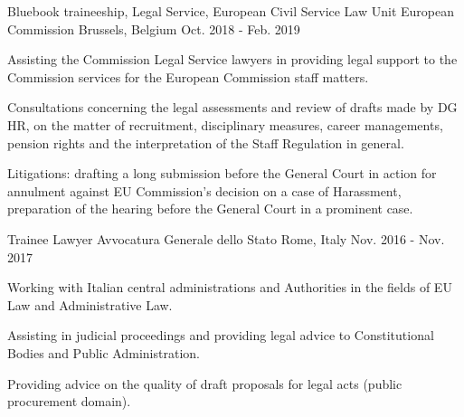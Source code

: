 \begin{cventries}
  \cventry
    {Bluebook traineeship, Legal Service, European Civil Service Law Unit} %
    {European Commission} %
    {Brussels, Belgium} %
    {Oct. 2018 - Feb. 2019} %
    {
      \begin{cvitems} %
      \item {Assisting the Commission Legal Service lawyers in providing legal support to the Commission services for the European Commission staff
matters.}
       \item {Consultations concerning the legal assessments and review of drafts made by DG HR, on the matter of recruitment, disciplinary measures, career managements, pension rights and the interpretation of the Staff Regulation in general.}
        \item {Litigations: drafting a long submission before the General Court in action for annulment against EU Commission’s decision on a case of Harassment, preparation of the hearing before the General Court in a prominent case.}  
      \end{cvitems}
    }
    
  \cventry
    {Trainee Lawyer} %
    {Avvocatura Generale dello Stato} %
    {Rome, Italy} %
    {Nov. 2016 - Nov. 2017} %
    {
      \begin{cvitems} %
      	\item {Working with Italian central administrations and Authorities in the fields of EU Law and Administrative Law.}
        \item {Assisting in judicial proceedings and providing legal advice to Constitutional Bodies and Public Administration.}
        \item {Providing advice on the quality of draft proposals for legal acts (public procurement domain).}
      \end{cvitems}
    }


\end{cventries}
